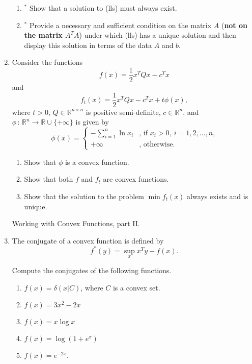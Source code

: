 \documentclass[12pt]{amsart}
\newcommand{\R}{{\mathbb{R}}}
\newcommand{\tpose}[1]{#1^{\scriptscriptstyle T}}
\begin{document}
\begin{enumerate}
\begin{enumerate}
\item$^*$ Show that a solution to (lls) must always exist.
\item$^*$ Provide a necessary and sufficient condition on the matrix
$A$ ({\bf not on the matrix $A^TA$}) under which (lls)
has a unique solution and then display this solution in terms
of the data $A$ and $b$.
\end{enumerate}
\item
Consider the functions
$$f(x)=\frac{1}{2} \tpose{x} Q x -\tpose{c}x $$
and
$$
f_t(x)=\frac{1}{2} \tpose{x} Q x -\tpose{c}x +t\phi(x),
$$
where $t>0$, $Q\in\R^{n\times n}$ is positive semi-definite,
$c\in\R^n$, and $\phi\, :\, \R^n\rightarrow\R\cup\{+\infty\}$
is given by
$$
\phi(x)=\left\{\begin{array}{ll}
-\sum_{i=1}^n\ln x_i&\mbox{, if $x_i> 0,\ i=1,2,\dots ,n$,}\\
+\infty&\mbox{, otherwise.}\end{array}\right.
$$
\begin{enumerate}
\item
Show that $\phi$ is a convex function.
\item
Show that both $f$ and $f_t$ are convex functions.
\item
Show that the solution to the problem $\min f_t(x)$ always
exists and is unique.
\end{enumerate}



\newpage

\noindent
{\sf Working with Convex Functions, part II.}

\item The conjugate of a convex function is defined by 
\[
f^*(y) = \sup_x x^Ty - f(x).
\]

Compute the conjugates of the following functions. 
\begin{enumerate}

\item $f(x) = \delta(x|C)$, where $C$ is a convex set.  

\item $f(x) = 3x^2 - 2x$ 

\item $f(x) = x\log x$

\item $f(x) = \log(1 + e^x)$

\item $f(x) = e^{-2x}$.


\end{enumerate}
\end{enumerate}
\end{document}

